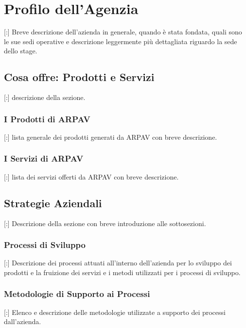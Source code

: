 \chapter{Profilo dell'Agenzia}

\thispagestyle{fancy} 

[:] Breve descrizione dell'azienda in generale, quando è stata fondata, quali sono le sue sedi operative e descrizione leggermente più dettagliata riguardo la sede dello stage.

\section{Cosa offre: Prodotti e Servizi}

[:] descrizione della sezione.

\subsection{I Prodotti di ARPAV}

[:] lista generale dei prodotti generati da ARPAV con breve descrizione.

\subsection{I Servizi di ARPAV}

[:] lista dei servizi offerti da ARPAV con breve descrizione.

\section{Strategie Aziendali}

[:] Descrizione della sezione con breve introduzione alle sottosezioni.

\subsection{Processi di Sviluppo}

[:] Descrizione dei processi attuati all'interno dell'azienda per lo sviluppo dei prodotti e la fruizione dei servizi e i metodi utilizzati per i processi di sviluppo.

\subsection{Metodologie di Supporto ai Processi}

[:] Elenco e descrizione delle metodologie utilizzate a supporto dei processi dall'azienda.

